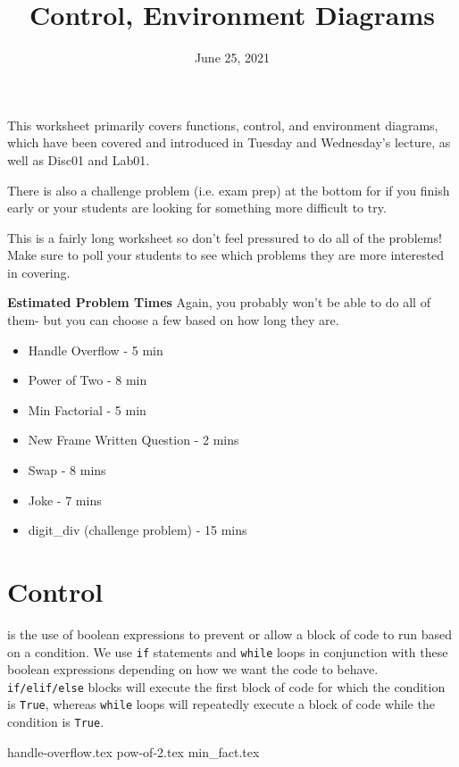 \documentclass{exam}
\title{Control, Environment Diagrams}
\date{June 25, 2021}
\begin{document}
\maketitle


\begin{blocksection}
\begin{guide}
  This worksheet primarily covers functions, control, and environment diagrams, which have been covered and introduced in Tuesday and Wednesday's lecture, as well as Disc01 and Lab01.
  
  There is also a challenge problem (i.e. exam prep) at the bottom for if you finish early or your students are looking for something more difficult to try.
  
This is a fairly long worksheet so don't feel pressured to do all of the problems! Make sure to poll your students to see which problems they are more interested in covering.

\textbf{Estimated Problem Times}
\newline
Again, you probably won't be able to do all of them- but you can choose a few based on how long they are.
\begin{itemize}
    \item Handle Overflow - 5 min
    \item Power of Two - 8 min
    \item Min Factorial - 5 min
    \item New Frame Written Question - 2 mins
    \item Swap - 8 mins
    \item Joke - 7 mins
    \item digit\_div (challenge problem) - 15 mins
\end{itemize}
\end{guide}
\end{blocksection}

\section{Control}
\begin{blocksection}
 is the use of boolean expressions to prevent or allow a block of code to run based on a condition.
We use \texttt{if} statements and \texttt{while} loops in conjunction with these boolean expressions depending on how we want the code to behave.
\texttt{if/elif/else} blocks will execute the first block of code for which the condition is \texttt{True}, whereas \texttt{while} loops will repeatedly
execute a block of code while the condition is \texttt{True}.
\end{blocksection}
\begin{questions}
{handle-overflow.tex}
{pow-of-2.tex}
\newpage
{min_fact.tex}
\end{questions}
\end{document}
